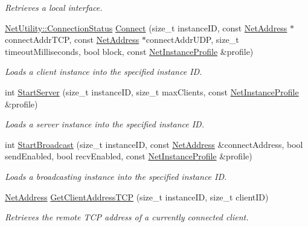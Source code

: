 \begin{DoxyCompactItemize}
\begin{DoxyCompactList}\small\item\em Retrieves a local interface. \item\end{DoxyCompactList}\item 
\hyperlink{class_net_utility_a7eae52138f8bd597ffc67ebf07e86b6d}{NetUtility::ConnectionStatus} \hyperlink{namespacemn_a4c829125861bed7e33afcf3cfd25b834}{Connect} (size\_\-t instanceID, const \hyperlink{class_net_address}{NetAddress} $\ast$connectAddrTCP, const \hyperlink{class_net_address}{NetAddress} $\ast$connectAddrUDP, size\_\-t timeoutMilliseconds, bool block, const \hyperlink{class_net_instance_profile}{NetInstanceProfile} \&profile)
\begin{DoxyCompactList}\small\item\em Loads a client instance into the specified instance ID. \item\end{DoxyCompactList}\item 
int \hyperlink{namespacemn_ae6efe6a55174aa31805c0d7768f3e08c}{StartServer} (size\_\-t instanceID, size\_\-t maxClients, const \hyperlink{class_net_instance_profile}{NetInstanceProfile} \&profile)
\begin{DoxyCompactList}\small\item\em Loads a server instance into the specified instance ID. \item\end{DoxyCompactList}\item 
int \hyperlink{namespacemn_a286e995f3afa08292c38838bb3908fb9}{StartBroadcast} (size\_\-t instanceID, const \hyperlink{class_net_address}{NetAddress} \&connectAddress, bool sendEnabled, bool recvEnabled, const \hyperlink{class_net_instance_profile}{NetInstanceProfile} \&profile)
\begin{DoxyCompactList}\small\item\em Loads a broadcasting instance into the specified instance ID. \item\end{DoxyCompactList}\item 
\hyperlink{class_net_address}{NetAddress} \hyperlink{namespacemn_a999a5af217f64d3c18ee9a94c1f94b4d}{GetClientAddressTCP} (size\_\-t instanceID, size\_\-t clientID)
\begin{DoxyCompactList}\small\item\em Retrieves the remote TCP address of a currently connected client. \item\end{DoxyCompactList}\item 

\end{DoxyCompactItemize}
